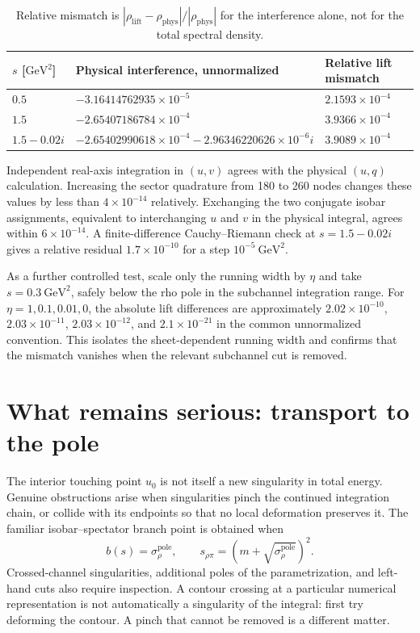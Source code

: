 \documentclass[11pt,a4paper]{article}
\newcommand{\phys}{\mathrm{phys}}
\begin{document}
\begin{table}[ht]\centering\small
\begin{tabular}{@{}lll@{}}\toprule
$s$ [$\mathrm{GeV}^2$] & Physical interference, unnormalized & Relative lift mismatch\\\midrule
$0.5$ & $-3.16414762935\times10^{-5}$ & $2.1593\times10^{-4}$\\
$1.5$ & $-2.65407186784\times10^{-4}$ & $3.9366\times10^{-4}$\\
$1.5-0.02i$ & $-2.65402990618\times10^{-4}-2.96346220626\times10^{-6}i$ & $3.9089\times10^{-4}$\\\bottomrule
\end{tabular}
\caption{Relative mismatch is $|\rho_{\mathrm{lift}}-\rho_{\phys}|/|\rho_{\phys}|$ for the interference alone, not for the total spectral density.}
\end{table}

Independent real-axis integration in $(u,v)$ agrees with the physical $(u,q)$ calculation. Increasing the sector quadrature from 180 to 260 nodes changes these values by less than $4\times10^{-14}$ relatively. Exchanging the two conjugate isobar assignments, equivalent to interchanging $u$ and $v$ in the physical integral, agrees within $6\times10^{-14}$. A finite-difference Cauchy--Riemann check at $s=1.5-0.02i$ gives a relative residual $1.7\times10^{-10}$ for a step $10^{-5}\ \mathrm{GeV}^2$.

As a further controlled test, scale only the running width by $\eta$ and take $s=0.3\ \mathrm{GeV}^2$, safely below the rho pole in the subchannel integration range. For $\eta=1,0.1,0.01,0$, the absolute lift differences are approximately $2.02\times10^{-10}$, $2.03\times10^{-11}$, $2.03\times10^{-12}$, and $2.1\times10^{-21}$ in the common unnormalized convention. This isolates the sheet-dependent running width and confirms that the mismatch vanishes when the relevant subchannel cut is removed.

\section{What remains serious: transport to the pole}
The interior touching point $u_0$ is not itself a new singularity in total energy. Genuine obstructions arise when singularities pinch the continued integration chain, or collide with its endpoints so that no local deformation preserves it. The familiar isobar--spectator branch point is obtained when
\begin{equation}
 b(s)=\sigma_\rho^{\mathrm{pole}},\qquad
 s_{\rho\pi}=(m+\sqrt{\sigma_\rho^{\mathrm{pole}}})^2.
\end{equation}
Crossed-channel singularities, additional poles of the parametrization, and left-hand cuts also require inspection. A contour crossing at a particular numerical representation is not automatically a singularity of the integral: first try deforming the contour. A pinch that cannot be removed is a different matter.
\end{document}
